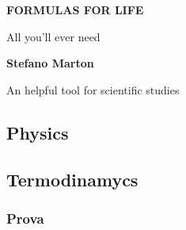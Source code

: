 \documentclass[a4paper]{report}
\begin{document}
\begin{titlepage}
    \begin{center}
        \vspace*{6cm}
            
        \Huge
        \textbf{FORMULAS FOR LIFE}
            
        \vspace{0.5cm}
        \LARGE
        All you'll ever need
            
        \vspace{1.5cm}
            
        \textbf{Stefano Marton}
            
        \vfill
            
        An helpful tool for scientific studies   
       
            
        \vspace{0.8cm}
            
            
    \end{center}
\end{titlepage}

\normalsize
\doublespacing
\setcounter{tocdepth}{2}
\tableofcontents
\newpage
\singlespacing
\normalsize
{}
\begin{center}
    
\chapter{Physics}
\end{center}

\section{Termodinamycs}
\begin{multicols}{2}

\subsection{Prova}

\end{multicols}
\end{document}
